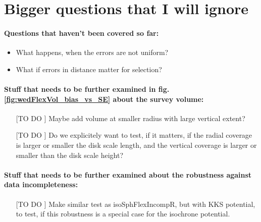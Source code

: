 
\section{Bigger questions that I will ignore}

\paragraph{Questions that haven't been covered so far:}
\begin{itemize}
\item What happens, when the errors are not uniform?
\item What if errors in distance matter for selection?
\end{itemize}

\paragraph{Stuff that needs to be further examined in fig. \ref{fig:wedFlexVol_bias_vs_SE} about the survey volume:}
\begin{itemize}
\item[[TO DO]] Maybe add volume at smaller radius with large vertical extent?
\item[[TO DO]] Do we explicitely want to test, if it matters, if the radial coverage is larger or smaller the disk scale length, and the vertical coverage is larger or smaller than the disk scale height?
\end{itemize}

\paragraph{Stuff that needs to be further examined about the robustness against data incompleteness:}
\begin{itemize}
\item[[TO DO]] Make similar test as isoSphFlexIncompR, but with KKS potential, to test, if this robustness is a special case for the isochrone potential.
\end{itemize}


%



